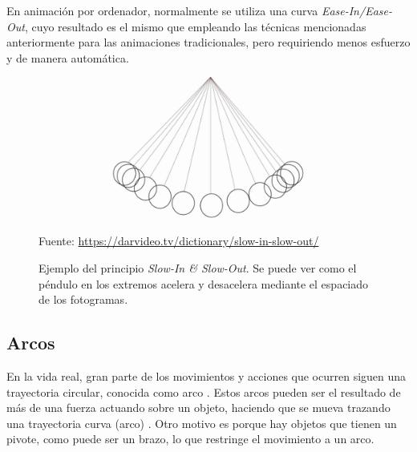 \documentclass{article}
\begin{document}
\bigskip

En animación por ordenador, normalmente se utiliza una curva \textit{Ease-In/Ease-Out}, cuyo resultado es el mismo que empleando las técnicas mencionadas anteriormente para las animaciones tradicionales, pero requiriendo menos esfuerzo y de manera automática.

\begin{figure}[H]
    \centering
    \includegraphics[width=\textwidth]{imagenes/Slow-In-and-Slow-Out.jpg}
    \caption{Ejemplo del principio \textit{Slow-In \& Slow-Out}. Se puede ver como el péndulo en los extremos acelera y desacelera mediante el espaciado de los fotogramas.}
    \vspace{10pt}
    \footnotesize{Fuente: \url{https://darvideo.tv/dictionary/slow-in-slow-out/}}
\end{figure}

\subsection{Arcos}


En la vida real, gran parte de los movimientos y acciones que ocurren siguen una trayectoria circular, conocida como arco \cite{arcsdsource}. Estos arcos pueden ser el resultado de más de una fuerza actuando sobre un objeto, haciendo que se mueva trazando una trayectoria curva (arco) \cite{arcslinkedin}. Otro motivo es porque hay objetos que tienen un pivote, como puede ser un brazo, lo que restringe el movimiento a un arco.
\end{document}
